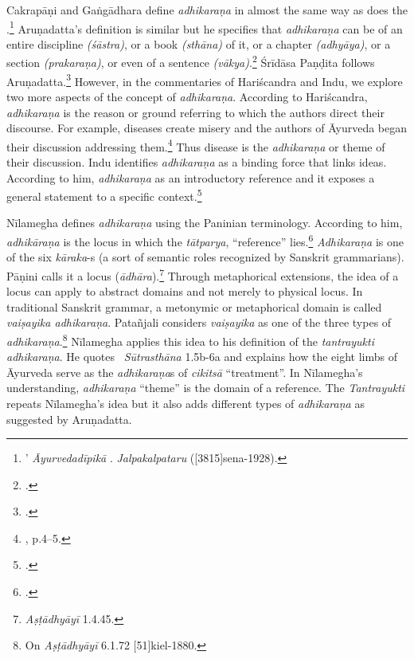Cakrapāṇi and Gaṅgādhara define \emph{adhikaraṇa} in almost the same way as does the \SS.\footnote{’  \emph{Āyurvedadīpikā} \parencite[736]{cara-trikamji3}.  \emph{Jalpakalpataru} ([3815]{sena-1928}).}
Aruṇadatta's definition is similar but he specifies that \emph{adhikaraṇa} can be of an entire discipline \emph{(śāstra)}, or a book \emph{(sthāna)} of it, or a chapter \emph{(adhyāya)}, or a section \emph{(prakaraṇa)}, or even of a sentence \emph{(vākya)}.\footnote{ \parencite[947]{kunt-1939}.}
Śrīdāsa Paṇḍita follows Aruṇadatta.\footcite[2]{muss-1940} 
However, in the commentaries of Hariścandra and Indu, we explore two more aspects of the concept of \emph{adhikaraṇa}. According to Hariścandra, \emph{adhikaraṇa} is the reason or ground referring to which the authors direct their discourse. For example, diseases create misery and the authors of Āyurveda began their discussion addressing them.\footnote{ , p.4--5.}
Thus disease is the \emph{adhikaraṇa} or theme of their discussion. Indu identifies \emph{adhikaraṇa} as a binding force that links ideas. According to him, \emph{adhikaraṇa} as an introductory reference and it exposes a general statement to a specific context.\footnote{ \parencite[959]{atha-1980}.} 

Nīlamegha defines \emph{adhikaraṇa} using the Paninian terminology. 
According to him, \emph{adhikāraṇa} is the locus in which the \emph{tātparya}, “reference” lies.\footnote{ \cite[1][2]{muth-1976}.} 
\emph{Adhikaraṇa} is one of the six \emph{kāraka}-s (a sort of semantic roles recognized by Sanskrit grammarians). 
Pāṇini calls it a locus (\emph{ādhāra}).\footnote{ \emph{Aṣṭādhyāyī} 1.4.45.} 
Through metaphorical extensions, the idea of a locus can apply to abstract domains and not merely to physical locus. 
In traditional Sanskrit grammar, a metonymic or metaphorical domain is called \emph{vaiṣayika adhikaraṇa}. 
Patañjali considers \emph{vaiṣayika} as one of the three types of \emph{adhikaraṇa}.\footnote{On \emph{Aṣṭādhyāyī} 6.1.72 [51]{kiel-1880}.} 
Nīlamegha applies this idea to his definition of the \emph{tantrayukti} \emph{adhikaraṇa}. 
He quotes \AHS\ \emph{Sūtrasthāna} 1.5b-6a and explains how the eight limbs of Āyurveda serve as the \emph{adhikaraṇa}s of \emph{cikitsā} “treatment”. 
In Nīlamegha's understanding, \emph{adhikaraṇa} “theme” is the domain of a reference. 
The \emph{Tantrayukti} repeats Nīlamegha's idea but it also adds different types of \emph{adhikaraṇa} as suggested by Aruṇadatta. 

